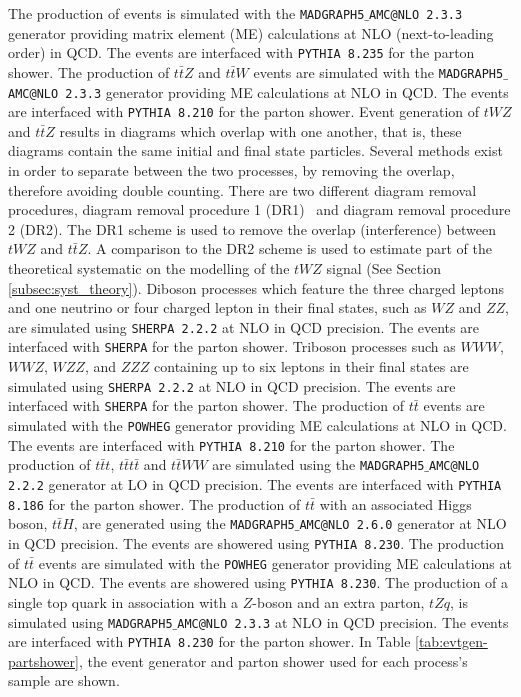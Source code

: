 The production of \tWZ events is simulated with the \texttt{MADGRAPH5$\_$AMC@NLO 2.3.3} generator providing matrix element (ME) calculations at NLO (next-to-leading order) in QCD. The events are interfaced with \texttt{PYTHIA 8.235} for the parton shower. The production of $t\bar{t}Z$ and $t\bar{t}W$ events are simulated with the \texttt{MADGRAPH5$\_$AMC@NLO 2.3.3} generator providing ME calculations at NLO in QCD. The events are interfaced with \texttt{PYTHIA 8.210} for the parton shower. Event generation of $tWZ$ and $t\bar{t}Z$ results in diagrams which overlap with one another, that is, these diagrams contain the same initial and final state particles. Several methods exist in order to separate between the two processes, by removing the overlap, therefore avoiding double counting. There are two different diagram removal procedures, diagram removal procedure 1 (DR1)~\cite{Demartin:2016axk} and diagram removal procedure 2 (DR2). The DR1 scheme is used to remove the overlap (interference) between $tWZ$ and $t\bar{t}Z$. A comparison to the DR2 scheme is used to estimate part of the theoretical systematic on the modelling of the $tWZ$ signal (See Section \ref{subsec:syst_theory}). Diboson processes which feature the three charged leptons and one neutrino or four charged lepton in their final states, such as $WZ$ and $ZZ$, are simulated using \texttt{SHERPA 2.2.2} at NLO in QCD precision. The events are interfaced with \texttt{SHERPA} for the parton shower. Triboson processes such as $WWW$, $WWZ$, $WZZ$, and $ZZZ$ containing up to six leptons in their final states are simulated using \texttt{SHERPA 2.2.2} at NLO in QCD precision. The events are interfaced with \texttt{SHERPA} for the parton shower. The production of $t\bar{t}$ events are simulated with the \texttt{POWHEG} generator providing ME calculations at NLO in QCD. The events are interfaced with \texttt{PYTHIA 8.210} for the parton shower. The production of $t\bar{t}t$, $t\bar{t}t\bar{t}$ and $t\bar{t}WW$ are simulated using the \texttt{MADGRAPH5$\_$AMC@NLO 2.2.2} generator at LO in QCD precision. The events are interfaced with \texttt{PYTHIA 8.186} for the parton shower. The production of $t\bar{t}$ with an associated Higgs boson, $t\bar{t}H$, are generated using the \texttt{MADGRAPH5$\_$AMC@NLO 2.6.0} generator at NLO in QCD precision. The events are showered using \texttt{PYTHIA 8.230}. The production of $t\bar{t}$ events are simulated with the \texttt{POWHEG} generator providing ME calculations at NLO in QCD. The events are showered using \texttt{PYTHIA 8.230}. The production of a single top quark in association with a $Z$-boson and an extra parton, $tZq$, is simulated using \texttt{MADGRAPH5$\_$AMC@NLO 2.3.3} at NLO in QCD precision. The events are interfaced with \texttt{PYTHIA 8.230} for the parton shower. In Table \ref{tab:evtgen-partshower}, the event generator and parton shower used for each process's sample are shown.

